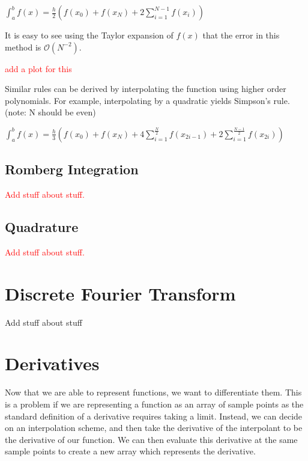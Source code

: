 \documentclass[12pt,letterpaper]{article}
\numberwithin{equation}{section}
\begin{document}
\begin{center}
$\int_{a}^{b}f(x) = \frac{h}{2}(f(x_0)+f(x_N) + 2\sum_{i=1}^{N-1}f(x_i))$
\end{center}

It is easy to see using the Taylor expansion of $f(x)$ that the error in this method is $\mathcal{O}(N^{-2})$.

\begin{center}
\textcolor{red}{add a plot for this}
\end{center}

Similar rules can be derived by interpolating the function using higher order polynomials. For example, interpolating by a quadratic yields Simpson's rule. (note: N should be even)

\begin{center}
$\int_{a}^{b}f(x) = \frac{h}{3}(f(x_0)+f(x_N) + 4\sum_{i=1}^{\frac{N}{2}}f(x_{2i-1}) + 2\sum_{i=1}^{\frac{N - 1}{2}}f(x_{2i}))$
\end{center}

\newpage
\subsection{Romberg Integration}
\begin{center}
\textcolor{red}{Add stuff about stuff.}
\end{center}

\newpage
\subsection{Quadrature}
\begin{center}
\textcolor{red}{Add stuff about stuff.}
\end{center}

\newpage
\section{Discrete Fourier Transform}
Add stuff about stuff

\newpage
\section{Derivatives}
Now that we are able to represent functions, we want to differentiate them. This is a problem if we are representing a function as an array of sample points as the standard definition of a derivative requires taking a limit. Instead, we can decide on an interpolation scheme, and then take the derivative of the interpolant to be the derivative of our function. We can then evaluate this derivative at the same sample points to create a new array which represents the derivative.
\end{document}

